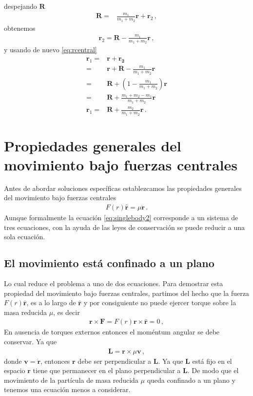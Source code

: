 despejando $\mathbf{R}$
\begin{align}
     \mathbf{R}=&\frac{m_1}{m_1+m_2}\mathbf{r}+\mathbf{r}_2\,,
\end{align}
obtenemos
\begin{align}
\label{eq:r2}
  \mathbf{r}_2=\mathbf{R}-\frac{m_1}{m_1+m_2}\mathbf{r}\,,
\end{align}
y usando de nuevo \eqref{eq:rcentral}
\begin{align}
\label{eq:r1}
  \mathbf{r}_1=&\mathbf{r}+\mathbf{r_2}\nonumber\\
  =&\mathbf{r}+\mathbf{R}-\frac{m_1}{m_1+m_2}\mathbf{r}\nonumber\\
  =&\mathbf{R}+\left(1-\frac{m_1}{m_1+m_2}\right)\mathbf{r}\nonumber\\
  =&\mathbf{R}+\frac{m_1+m_2-m_1}{m_1+m_2}\mathbf{r}\nonumber\\
  \mathbf{r}_1  =&\mathbf{R}+\frac{m_2}{m_1+m_2}\mathbf{r}\,.
\end{align}

\section{Propiedades generales del movimiento bajo fuerzas centrales}
Antes de abordar soluciones específicas establezcamos las propiedades generales del movimiento bajo fuerzas centrales
\begin{align}
  \label{eq:singlebody2}
  F(r)\hat{\mathbf{r}}=\mu \ddot{\mathbf{r}}\,.
\end{align}
Aunque formalmente la ecuación \eqref{eq:singlebody2} corresponde a un sistema de tres ecuaciones, con la ayuda de las leyes de conservación se puede reducir a una sola ecuación.

\subsection{El movimiento está confinado a un plano}
Lo cual reduce el problema a uno de dos ecuaciones. Para demostrar esta propiedad del movimiento bajo fuerzas centrales, partimos del hecho que la fuerza $F(r)\hat{\mathbf{r}}$, es a lo largo de $\hat{\mathbf{r}}$ y por consiguiente no puede ejercer torque sobre la masa reducida $\mu$, es decir
\begin{align}
  \mathbf{r}\times\mathbf{F}=F(r)\mathbf{r}\times\hat{\mathbf{r}}=0\,,
\end{align}
En ausencia de torques externos entonces el moméntum angular se debe conservar. Ya que
\begin{align}
  \mathbf{L}=\mathbf{r}\times \mu \mathbf{v}\,,
\end{align}
donde $\mathbf{v}=\dot{\mathbf{r}}$, entonces $\mathbf{r}$ debe ser perpendicular a $\mathbf{L}$. Ya que $\mathbf{L}$ está fijo en el espacio $\mathbf{r}$ tiene que permanecer en el plano perpendicular a $\mathbf{L}$. De modo que el movimiento de la partícula de masa reducida $\mu$ queda confinado a un plano y tenemos una ecuación menos a considerar.

